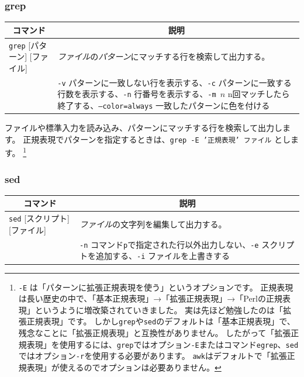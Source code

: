 \documentclass[a4j]{ltjreport}
\begin{document}
    \subsubsection{grep}

    \begin{longtable}[c]{|p{3.5cm}|p{13.5cm}|}
        \hline
        \multicolumn{1}{|c|}{\textbf{コマンド}}&\multicolumn{1}{|c|}{\textbf{説明}}\\
        \hline\hline
        \texttt{grep} {\footnotesize [パターン] [ファイル]}  &\emph{ファイル}の\emph{パターン}にマッチする行を検索して出力する。\\
        & \texttt{-v} パターンに一致しない行を表示する、\texttt{-c} パターンに一致する行数を表示する、\texttt{-n} 行番号を表示する、\texttt{-m $n$} n回マッチしたら終了する、\texttt{--color=always} 一致したパターンに色を付ける \\
        \hline
    \end{longtable}

    ファイルや標準入力を読み込み、パターンにマッチする行を検索して出力します。
    正規表現でパターンを指定するときは、\texttt{grep -E '正規表現' ファイル} とします。
    \footnote{\texttt{-E} は「パターンに拡張正規表現を使う」というオプションです。
    正規表現は長い歴史の中で、「基本正規表現」→「拡張正規表現」→「Perlの正規表現」というように増改築されていきました。
    実は先ほど勉強したのは「拡張正規表現」です。
    しかし\texttt{grep}や\texttt{sed}のデフォルトは「基本正規表現」で、残念なことに「拡張正規表現」と互換性がありません。
    したがって「拡張正規表現」を使用するには、\texttt{grep}ではオプション\texttt{-E}またはコマンド\texttt{egrep}、\texttt{sed}ではオプション\texttt{-r}を使用する必要があります。
    \texttt{awk}はデフォルトで「拡張正規表現」が使えるのでオプションは必要ありません。}

    \subsubsection{sed} 

    \begin{longtable}[c]{|p{3.5cm}|p{13.5cm}|}
        \hline
        \multicolumn{1}{|c|}{\textbf{コマンド}}&\multicolumn{1}{|c|}{\textbf{説明}}\\
        \hline\hline
        \texttt{sed} {\footnotesize [スクリプト] [ファイル]}   &\emph{ファイル}の文字列を編集して出力する。\\
        & \texttt{-n} コマンド\texttt{p}で指定された行以外出力しない、\texttt{-e} スクリプトを追加する、\texttt{-i} ファイルを上書きする \\
        \hline
    \end{longtable}
\end{document}
